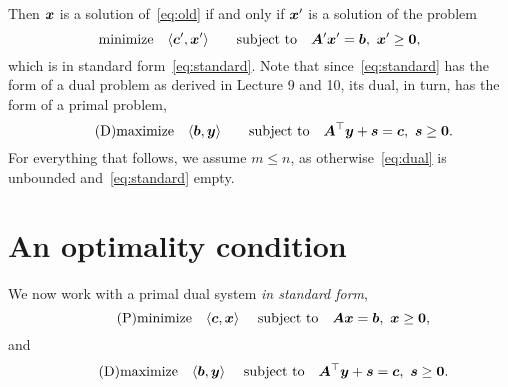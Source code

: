 Then $\bm{x}$ is a solution of~\eqref{eq:old} if and only if $\bm{x}'$ is a solution of the 
problem 
\begin{equation*}
  \text{minimize}\quad \langle {\bm{c}'}, {\bm{x}'} \rangle \quad \quad\text{subject to}\quad \bm{A}'\bm{x}'=\bm{b}, \ \bm{x}'\geq \bm{0},
\end{equation*}
which is in standard form~\eqref{eq:standard}. Note that since~\eqref{eq:standard} has the form of a dual problem as derived in Lecture 9 and 10, its dual, in turn, has the form of a primal problem,
\begin{equation}\label{eq:dual}\tag{D}
\text{maximize}\quad \langle {\bm{b}}, {\bm{y}} \rangle \quad \quad\text{subject to}\quad \bm{A}^{\top}\bm{y}+\bm{s}=\bm{c}, \ \bm{s}\geq \bm{0}.
\end{equation}
For everything that follows, we assume $m\leq n$, as otherwise~\eqref{eq:dual} is unbounded and~\eqref{eq:standard} empty.

\section{An optimality condition}
We now work with a primal dual system {\em in standard form},
\begin{equation}\label{eq:primal1}\tag{P}
  \text{minimize}\quad \langle {\bm{c}}, {\bm{x}} \rangle \ \quad\text{subject to}\quad \bm{A}\bm{x}=\bm{b}, \  \bm{x}\geq \bm{0},
\end{equation}
and
\begin{equation}\label{eq:dual1}\tag{D}
\text{maximize}\quad \langle {\bm{b}}, {\bm{y}} \rangle \ \quad\text{subject to}\quad \bm{A}^{\top}\bm{y}+\bm{s}= \bm{c}, \ \bm{s}\geq \bm{0}.
\end{equation}

